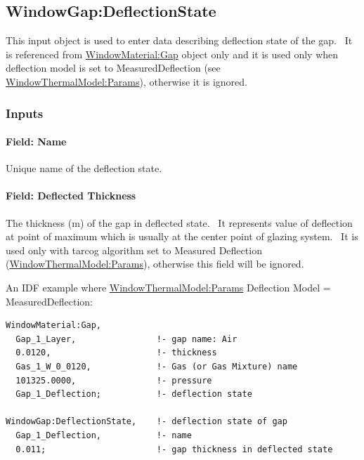 \subsection{WindowGap:DeflectionState}\label{windowgapdeflectionstate}

This input object is used to enter data describing deflection state of the gap.~ It is referenced from \hyperref[windowmaterialgap]{WindowMaterial:Gap} object only and it is used only when deflection model is set to MeasuredDeflection (see \hyperref[windowthermalmodelparams]{WindowThermalModel:Params}), otherwise it is ignored.

\subsubsection{Inputs}\label{inputs-19-006}

\paragraph{Field: Name}\label{field-name-13-010}

Unique name of the deflection state.

\paragraph{Field: Deflected Thickness}\label{field-deflected-thickness}

The thickness (m) of the gap in deflected state.~ It represents value of deflection at point of maximum which is usually at the center point of glazing system.~ It is used only with tarcog algorithm set to Measured Deflection (\hyperref[windowthermalmodelparams]{WindowThermalModel:Params}), otherwise this field will be ignored.

An IDF example where \hyperref[windowthermalmodelparams]{WindowThermalModel:Params} Deflection Model = MeasuredDeflection:

\begin{lstlisting}
WindowMaterial:Gap,
  Gap_1_Layer,                !- gap name: Air
  0.0120,                     !- thickness
  Gas_1_W_0_0120,             !- Gas (or Gas Mixture) name
  101325.0000,                !- pressure
  Gap_1_Deflection;           !- deflection state

WindowGap:DeflectionState,    !- deflection state of gap
  Gap_1_Deflection,           !- name
  0.011;                      !- gap thickness in deflected state
\end{lstlisting}

